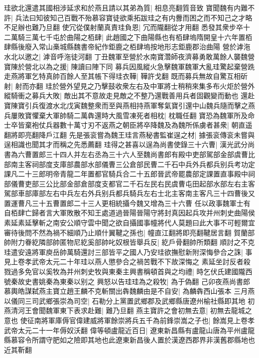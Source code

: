 珪欲北還遣其國相涉延求和於燕且請以其弟為質|{
	相息亮翻質音致}
寶聞魏有内難不許|{
	兵法曰知彼知己百戰不殆慕容寶徒欲乘拓跋珪之有内釁而困之而不知己之才略不足辦也難乃旦翻}
使冗從僕射蘭真責珪負恩|{
	冗而隴翻從才用翻}
悉發其衆步卒十二萬騎三萬七千屯於曲陽之栢肆|{
	此趙國之下曲陽縣也有栢肆塢隋開皇十六年置栢肆縣後廢入常山槀城縣魏書帝紀作鉅鹿之栢肆塢按地形志鉅鹿郡治曲陽}
營於滹沲水北以邀之|{
	滹音呼沲徒河翻}
丁丑魏軍至營於水南寶濳師夜濟募勇敢萬餘人襲魏營寶陳於營北以為之援|{
	陳讀曰陣下同}
募兵因風縱火急擊魏軍魏軍大亂珪驚起棄營跣走燕將軍乞特真帥百餘人至其帳下得珪衣鞾|{
	鞾許戈翻}
既而募兵無故自驚互相斫射|{
	射而亦翻}
珪於營外望見之乃擊鼓收衆左右及中軍將士稍稍來集多布火炬於營外縱騎衝之募兵大敗|{
	敵出其不意故走見敵之不整乃還戰善用兵者固觀變而動也}
還赴寶陳寶引兵復渡水北戊寅魏整衆而至與燕相持燕軍奪氣寶引還中山魏兵隨而擊之燕兵屢敗寶懼棄大軍帥騎二萬犇還時大風雪凍死者相枕|{
	枕職任翻}
寶恐為魏軍所及命士卒皆棄袍仗兵器數十萬寸刃不返燕之朝臣將卒降魏及為魏所係虜者甚衆|{
	朝直遥翻將即亮翻降戶江翻}
先是張衮嘗為魏王珪言燕秘書監崔逞之材|{
	據張衮傳衮未嘗與逞相識也聞其才而稱之先悉薦翻}
珪得之甚喜以逞為尚書使錄三十六曹|{
	漢光武分尚書為六曹置郎三十四人并左右丞為三十六人至魏尚書郎有殿中吏部駕部金部虞曹比部南主客祠部度支庫部農部水部儀曹三公倉部民曹二千石中兵外兵都兵别兵考功定課凡二十三郎明帝青龍二年置都官騎兵合二十五郎晉武帝罷農部定課置直事殿中祠部儀曹吏部三公比部金部倉部度支都官二千石左民右民虞曹屯田起部水部左右主客駕部車部庫部左右中兵左右外兵别兵都兵騎兵左右士北主客南主客凡三十四曹後又置運曹凡三十五曹置郎二十三人更相統攝今魏又增為三十六曹}
任以政事魏軍士有自栢肆亡歸者言大軍敗散不知王處道過晉陽晉陽守將封真因起兵攻并州刺史曲陽侯素延素延擊斬之南安公順守雲中聞之欲自攝國事幢將代人莫題曰此大事不可輕爾宜審待後問不然為禍不細順乃止順什翼鞬之孫也|{
	幢直江翻將即亮翻鞬居言翻}
賀蘭部帥附力眷紇隣部帥匿物尼紇奚部帥叱奴根皆舉兵反|{
	紇戶骨翻帥所類翻}
順討之不克珪遣安遠將軍庾岳帥萬騎還討三部皆平之國人乃安珪欲撫慰新附深悔參合之誅|{
	事見上卷孝武帝太元二十年珪以燕人懲參合之禍苦戰不下故深悔之}
素延坐討反者殺戮過多免官以奚牧為并州刺史牧與東秦主興書稱頓首與之均禮|{
	時乞伏氏建國隴西號秦故史書姚秦為東秦以别之}
興怒以告珪珪為之殺牧|{
	為于偽翻}
己卯夜燕尚書郎慕輿皓謀弑燕主寶立趙王麟不克斬關出犇魏麟由是不自安|{
	為麟犇西山張本}
三月燕以儀同三司武鄉張崇為司空|{
	石勒分上黨置武鄉郡及武鄉縣唐遼州榆社縣即其地}
初燕清河王會聞魏軍東下表求赴難|{
	難乃旦翻}
燕主寶許之會初無去意|{
	初無去龍城之意也}
使征南將軍庫傉官偉建威將軍餘崇將兵五千為前鋒崇嵩之子也|{
	餘嵩見上卷孝武帝太元二十一年傉奴沃翻}
偉等頓盧龍近百日|{
	遼東新昌縣有盧龍山唐為平州盧龍縣慕容令所謂守肥如之險即其地也此遼東新昌後人置於漢遼西郡界非漢舊郡縣地也近其靳翻}
